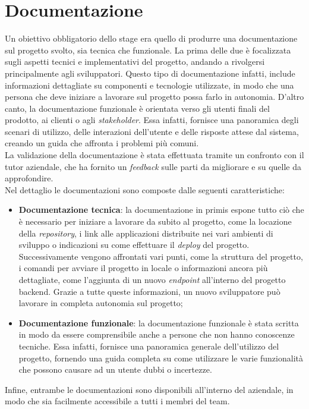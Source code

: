 \section{Documentazione}\label{sec:documentazione}
Un obiettivo obbligatorio dello stage era quello di produrre una documentazione sul progetto svolto, sia tecnica che funzionale.
La prima delle due è focalizzata sugli aspetti tecnici e implementativi del progetto, andando a rivolgersi principalmente agli sviluppatori.
Questo tipo di documentazione infatti, include informazioni dettagliate su componenti e tecnologie utilizzate, in modo che una persona che deve iniziare a lavorare sul progetto
possa farlo in autonomia.
D'altro canto, la documentazione funzionale è orientata verso gli utenti finali del prodotto, ai clienti o agli \textit{stakeholder}.
Essa infatti, fornisce una panoramica degli scenari di utilizzo, delle interazioni dell'utente e delle risposte attese dal sistema, creando un guida che affronta i problemi più comuni.\\
La validazione della documentazione è stata effettuata tramite un confronto con il tutor aziendale, che ha fornito un \textit{feedback} sulle parti da migliorare e su quelle da approfondire.\\
Nel dettaglio le documentazioni sono composte dalle seguenti caratteristiche:
\begin{itemize}
  \item \textbf{Documentazione tecnica}: la documentazione in primis espone tutto ciò che è necessario per iniziare a lavorare da subito al progetto, come la locazione della \textit{repository}, i link 
  alle applicazioni distribuite nei vari ambienti di sviluppo o indicazioni su come effettuare il \textit{deploy} del progetto.\\
  Successivamente vengono affrontati vari punti, come la struttura del progetto, i comandi per avviare il progetto in locale o informazioni ancora più dettagliate, come l'aggiunta di un nuovo \textit{endpoint} all'interno del progetto backend.
  Grazie a tutte queste informazioni, un nuovo sviluppatore può lavorare in completa autonomia sul progetto;
  \item \textbf{Documentazione funzionale}: la documentazione funzionale è stata scritta in modo da essere comprensibile anche a persone che non hanno conoscenze tecniche.
  Essa infatti, fornisce una panoramica generale dell'utilizzo del progetto, fornendo una guida completa su come utilizzare le varie funzionalità che possono
  causare ad un utente dubbi o incertezze.
\end{itemize}
Infine, entrambe le documentazioni sono disponibili all'interno del  aziendale, in modo che sia facilmente accessibile a tutti i membri del team.

